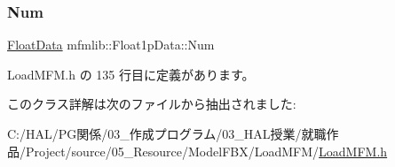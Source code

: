 \subsubsection{\texorpdfstring{Num}{Num}}
{\footnotesize\ttfamily \mbox{\hyperlink{classmfmlib_1_1_float_data}{Float\+Data}} mfmlib\+::\+Float1p\+Data\+::\+Num}



 Load\+M\+F\+M.\+h の 135 行目に定義があります。



このクラス詳解は次のファイルから抽出されました\+:\begin{DoxyCompactItemize}
\item 
C\+:/\+H\+A\+L/\+P\+G関係/03\+\_\+作成プログラム/03\+\_\+\+H\+A\+L授業/就職作品/\+Project/source/05\+\_\+\+Resource/\+Model\+F\+B\+X/\+Load\+M\+F\+M/\mbox{\hyperlink{_load_m_f_m_8h}{Load\+M\+F\+M.\+h}}\end{DoxyCompactItemize}
